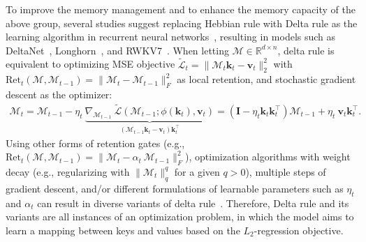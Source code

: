 \documentclass{article}
\newcommand{\vv}{\mathbf{v}}
\newcommand{\citep}{\parencite}
\newcommand{\undermath}[2]{\underset{#1}{\underbrace{#2}}}
\newcommand{\R}[0]{\mathbb{R}}
\newcommand{\M}[0]{\mathcal{M}}
\newcommand{\head}[1]{\vspace{1.7mm}\noindent{{\textcolor{c4}{\bf #1.}}}}
\newcommand{\vk}{\boldsymbol{k}}
\renewcommand{\vv}{\boldsymbol{v}}
\begin{document}
{\head{RNNs with Delta Rule} To improve the memory management and to enhance the memory capacity of the above group, several studies suggest replacing Hebbian rule with Delta rule as the learning algorithm in recurrent neural networks~\citep{schlag2021linear}, resulting in models such as DeltaNet~\citep{schlag2021linear}, Longhorn~\citep{liu2024longhorn}, and RWKV7~\citep{peng2025rwkv7}. When letting $\M \in \R^{d \times n}$, delta rule is equivalent to optimizing MSE objective $\tilde{\mathcal{L}}_t = \|\M_t \vk_t - \vv_t\|^2_2$ with $\text{Ret}_t(\M, \M_{t-1}) = \| \M_t - \M_{t-1} \|_F^2$ as local retention, and stochastic gradient descent as the optimizer:
\begin{align}
    \M_t = \M_{t-1} - \eta_t \:  \undermath{\left(\M_{t-1}\vk_t - \vv_t\right) \vk_t^{\top}}{\nabla_{\M_{t-1}} \: \tilde{\mathcal{L}}\left( \M_{t-1}; \phi\left(\vk_t\right), \vv_t \right)} = \left( \mathbf{I} - \eta_t \vk_t \vk_t^{\top}\right) \M_{t-1} + \eta_t \:\vv_t \vk_t^{\top}.
\end{align}
Using other forms of retention gates (e.g., $\text{Ret}_t(\M, \M_{t-1}) = \| \M_t - \alpha_t \:\M_{t-1} \|_F^2$), optimization algorithms with weight decay (e.g., regularizing with $\|\M_{t}\|_q^q$ for a given $q > 0$), multiple steps of gradient descent, and/or different formulations of learnable parameters such as $\eta_t$ and $\alpha_t$ can result in diverse variants of delta rule~\citep{peng2025rwkv7, sun2024learning, hu2025improving, wang2025test, siems2025deltaproduct, irie2021going, liu2024longhorn, behrouz2025Miras}. Therefore, Delta rule and its variants are all instances of an optimization problem, in which the model aims to learn a mapping between keys and values based on the $L_2$-regression objective. 

}
\end{document}
